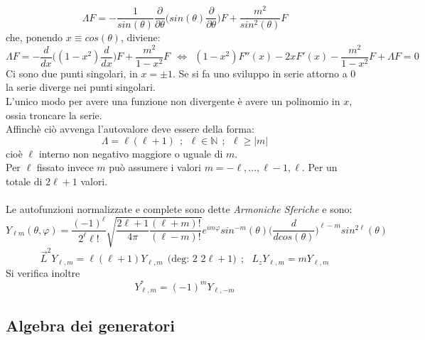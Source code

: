 \documentclass[twoside]{article}
\begin{document}
\begin{equation}
    \Lambda F=-\frac{1}{sin(\theta)}\frac{\partial}{\partial \theta}\biggl( sin(\theta) \frac{\partial}{\partial \theta}\biggr) F+\frac{m^2}{sin^2(\theta)}F
\end{equation}
che, ponendo $x\equiv cos(\theta)$, diviene:
\begin{equation}
    \Lambda F =-\frac{d}{dx}\biggl( (1-x^2)\frac{d}{dx}\biggr)F+\frac{m^2}{1-x^2}F \ \ \iff \ \ (1-x^2)F''(x)-2xF'(x)-\frac{m^2}{1-x^2}F+\Lambda F=0
\end{equation}
Ci sono due punti singolari, in $x=\pm1$.
Se si fa uno sviluppo in serie attorno a 0 la serie diverge nei punti singolari.
\\
L'unico modo per avere una funzione non divergente è avere un polinomio in $x$, ossia troncare la serie.
\\
Affinchè ciò avvenga l'autovalore deve essere della forma:
\begin{equation}
    \Lambda=\ell(\ell+1) \ \ ; \ \ \ell \in \mathds{N} \ \ ; \ \ \ell \ge |m|
\end{equation}
cioè $\ell$ interno non negativo maggiore o uguale di $m$.
\\
Per $\ell$ fissato invece $m$ può assumere i valori $m=-\ell,...,\ell-1,\ell$. Per un totale di $2\ell +1$ valori.
\\ \\
Le autofunzioni normalizzate e complete sono dette \textit{Armoniche Sferiche} e sono:
\begin{equation}
 Y_{\ell m}(\theta,\varphi)=\frac{(-1)^{\ell}}{2^{\ell}\ell !}\sqrt{\frac{2\ell +1}{4\pi}\frac{(\ell +m)!}{(\ell -m)!}} e^{im\varphi}sin^{-m}(\theta)\biggl( \frac{d}{dcos(\theta)} \biggr)^{\ell-m}sin^{2\ell}(\theta)
\end{equation}
\begin{equation}
    \Vec{L}^2 Y_{\ell,m}=\ell(\ell+1)Y_{\ell,m} \ \ \text{(deg: 2 $2\ell+1$)} \ \ ; \ \ \ L_z Y_{\ell,m}=mY_{\ell,m}
\end{equation}
Si verifica inoltre 
\begin{equation}
    Y_{\ell,m}^*=(-1)^m Y_{\ell,-m}
\end{equation}

\subsection{Algebra dei generatori}
\end{document}
